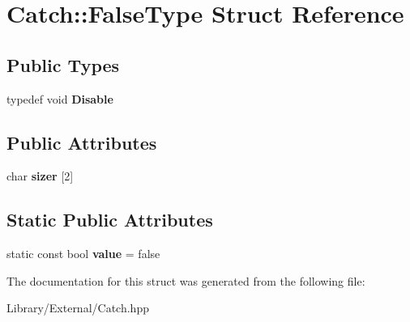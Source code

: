 \hypertarget{struct_catch_1_1_false_type}{}\section{Catch\+:\+:False\+Type Struct Reference}
\label{struct_catch_1_1_false_type}
\subsection*{Public Types}
\begin{DoxyCompactItemize}
\item 
\hypertarget{struct_catch_1_1_false_type_a9b1d652f081c774bdaea5d061bb3372c}{}typedef void {\bfseries Disable}\label{struct_catch_1_1_false_type_a9b1d652f081c774bdaea5d061bb3372c}

\end{DoxyCompactItemize}
\subsection*{Public Attributes}
\begin{DoxyCompactItemize}
\item 
\hypertarget{struct_catch_1_1_false_type_ad0a0468edb767e93e12459b816a89a88}{}char {\bfseries sizer} \mbox{[}2\mbox{]}\label{struct_catch_1_1_false_type_ad0a0468edb767e93e12459b816a89a88}

\end{DoxyCompactItemize}
\subsection*{Static Public Attributes}
\begin{DoxyCompactItemize}
\item 
\hypertarget{struct_catch_1_1_false_type_a34974ab2e06c898a360ba5f3b2d9ebe3}{}static const bool {\bfseries value} = false\label{struct_catch_1_1_false_type_a34974ab2e06c898a360ba5f3b2d9ebe3}

\end{DoxyCompactItemize}


The documentation for this struct was generated from the following file\+:\begin{DoxyCompactItemize}
\item 
Library/\+External/Catch.\+hpp\end{DoxyCompactItemize}
